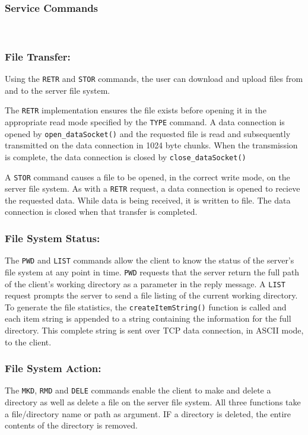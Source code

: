 \documentclass[10pt,twocolumn]{witseiepaper}
\begin{document}
\vspace*{-2mm}
\subsubsection{Service Commands} $    $

\vspace*{-2mm}
\subsubsection*{File Transfer:}
Using the \texttt{RETR} and \texttt{STOR} commands, the user can download and upload files from and to the server file system. 

The \texttt{RETR} implementation ensures the file exists before opening it in the appropriate read mode specified by the \texttt{TYPE} command. A data connection is opened by \texttt{open\_dataSocket()} and the requested file is read and subsequently transmitted on the data connection in 1024 byte chunks. When the transmission is complete, the data connection is closed by \texttt{close\_dataSocket()} 

A \texttt{STOR} command causes a file to be opened, in the correct write mode, on the server file system. As with a \texttt{RETR} request, a data connection is opened to recieve the requested data. While data is being received, it is written to file. The data connection is closed when that transfer is completed.

\vspace*{-2mm}
\subsubsection*{File System Status: }
The \texttt{PWD} and \texttt{LIST} commands allow the client to know the status of the server's file system at any point in time. \texttt{PWD} requests that the server return the full path of the client's working directory as a parameter in the reply message. A \texttt{LIST} request prompts the server to send a file listing of the current working directory. To generate the file statistics, the \texttt{createItemString()} function is called and each item string is appended to a string containing the information for the full directory. This complete string is sent over TCP data connection, in ASCII mode, to the client. 

\vspace*{-2mm}
\subsubsection*{File System Action: }
The \texttt{MKD}, \texttt{RMD} and \texttt{DELE} commands enable the client to make and delete a directory as well as delete a file on the server file system. All three functions take a file/directory name or path as argument. IF a directory is deleted, the entire contents of the directory is removed.
\end{document}
